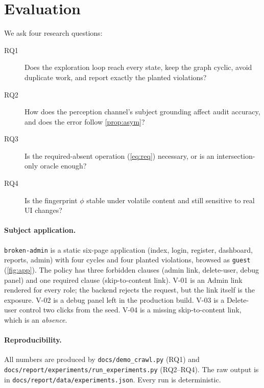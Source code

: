 \section{Evaluation}
\label{sec:eval}

We ask four research questions:
\begin{description}
  \item[RQ1] Does the exploration loop reach every state, keep the graph
    cyclic, avoid duplicate work, and report exactly the planted violations?
  \item[RQ2] How does the perception channel's subject grounding affect audit
    accuracy, and does the error follow \cref{prop:asym}?
  \item[RQ3] Is the required-absent operation (\cref{eq:req}) necessary, or is
    an intersection-only oracle enough?
  \item[RQ4] Is the fingerprint $\phi$ stable under volatile content and still
    sensitive to real UI changes?
\end{description}

\paragraph{Subject application.}
\texttt{broken-admin} is a static six-page application (index, login,
register, dashboard, reports, admin) with four cycles and four planted
violations, browsed as \texttt{guest} (\cref{fig:app}). The policy has three
forbidden clauses (admin link, delete-user, debug panel) and one required
clause (skip-to-content link). V-01 is an Admin link rendered for every role;
the backend rejects the request, but the link itself is the exposure. V-02 is
a debug panel left in the production build. V-03 is a Delete-user control two
clicks from the seed. V-04 is a missing skip-to-content link, which is an
\emph{absence}.

\paragraph{Reproducibility.}
All numbers are produced by
\nolinkurl{docs/demo_crawl.py} (RQ1) and
\nolinkurl{docs/report/experiments/run_experiments.py} (RQ2--RQ4). The raw
output is in \nolinkurl{docs/report/data/experiments.json}. Every run is
deterministic.

